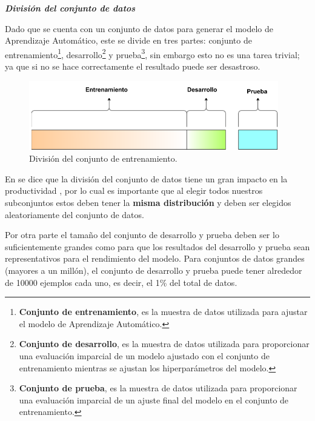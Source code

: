\vspace{5mm} %

\textbf{\textit{Divisi\'{o}n del conjunto de datos}}

\vspace{5mm} %

Dado que se cuenta con un conjunto de datos para generar el modelo de Aprendizaje Autom\'{a}tico, este se divide en tres partes: conjunto de entrenamiento\footnote{\textbf{Conjunto de entrenamiento}, es la muestra de datos utilizada para ajustar el modelo de Aprendizaje Autom\'{a}tico.}, desarrollo\footnote{\textbf{Conjunto de desarrollo}, es la muestra de datos utilizada para proporcionar una evaluaci\'{o}n imparcial de un modelo ajustado con el conjunto de entrenamiento mientras se ajustan los hiperpar\'{a}metros del modelo.} y prueba\footnote{\textbf{Conjunto de prueba}, es la muestra de datos utilizada para proporcionar una evaluaci\'{o}n imparcial de un ajuste final del modelo en el conjunto de entrenamiento.}, sin embargo esto no es una tarea trivial; ya que si no se hace correctamente el resultado puede ser desastroso.

\vspace{5mm} %

\begin{figure}[h!]
  \begin{center}	\includegraphics[width=0.97\textwidth]{imagenes/Cap3/train-dev-test}
  \caption{Divisi\'{o}n del conjunto de entrenamiento.}
  \label{fig:train-dev-test}
  \end{center}
\end{figure}

En \cite{41} se dice que la divisi\'{o}n del conjunto de datos tiene un gran impacto en la productividad , por lo cual es importante que al elegir todos nuestros subconjuntos estos deben tener la \textbf{misma distribuci\'{o}n} y deben ser elegidos aleatoriamente del conjunto de datos. 

\vspace{5mm} %

Por otra parte el tama\~{n}o del conjunto de desarrollo y prueba deben ser lo suficientemente grandes como para que los resultados del desarrollo y prueba sean representativos para el rendimiento del modelo. Para conjuntos de datos grandes (mayores a un mill\'{o}n), el conjunto de desarrollo y prueba puede tener alrededor de 10000 ejemplos cada uno, es decir, el 1\% del total de datos.

